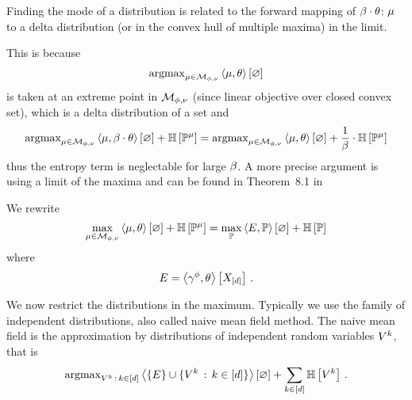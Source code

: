 
Finding the mode of a distribution is related to the forward mapping of $\beta\cdot\theta$: 
$\mu$ to a delta distribution (or in the convex hull of multiple maxima) in the limit.

This is because 
\begin{align*}
	\mathrm{argmax}_{\mu\in\mathcal{M}_{\phi,\nu}}  \left\langle \mu,\theta\right\rangle \left[ \varnothing \right]
\end{align*}
is taken at an extreme point in $\mathcal{M}_{\phi,\nu}$ (since linear objective over closed convex set), which is a delta distribution of a set and
\begin{align*}
	\mathrm{argmax}_{\mu\in\mathcal{M}_{\phi,\nu}}  \left\langle \mu,\beta\cdot\theta\right\rangle \left[ \varnothing \right]+ \mathbb{H}\left[\mathbb{P}^{\mu}\right] 
	= 
	\mathrm{argmax}_{\mu\in\mathcal{M}_{\phi,\nu}}  \left\langle \mu,\theta\right\rangle \left[ \varnothing \right] + \frac{1}{\beta} \cdot \mathbb{H}\left[\mathbb{P}^{\mu}\right] 	
\end{align*}
thus the entropy term is neglectable for large $\beta$.
A more precise argument is using a limit of the maxima and can be found in Theorem~8.1 in \cite{wainwright_graphical_2008}






We rewrite 
\begin{align*}
	\max_{\mu\in\mathcal{M}_{\phi,\nu}}  \left\langle \mu,\theta\right\rangle \left[ \varnothing \right] + \mathbb{H}\left[\mathbb{P}^{\mu}\right] 
	=
	\max_{\mathbb{P}} \left\langle E,\mathbb{P}\right\rangle \left[ \varnothing \right] + \mathbb{H}\left[\mathbb{P}\right]
\end{align*}
where
	\[ E = \left\langle \gamma^{\phi},\theta\right\rangle \left[ X_{[d]} \right] \, . \]

We now restrict the distributions in the maximum.
Typically we use the family of independent distributions, also called naive mean field method.
The naive mean field is the approximation by distributions of independent random variables $V^{k}$, that is
\begin{align*}
	\mathrm{argmax}_{V^{k} \, : \, k\in[d]} \left\langle \{E\} \cup \{V^{k} \, : \, k\in[d]\}\right\rangle \left[ \varnothing \right]
	+ \sum_{k\in[d]} \mathbb{H}\left[V^{k}\right] \, . 
\end{align*}


